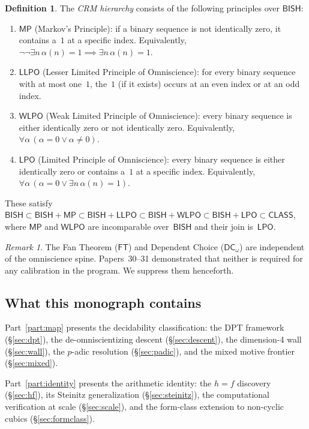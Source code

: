 \documentclass[11pt]{article}
\theoremstyle{plain}
\theoremstyle{definition}
\newtheorem{definition}[theorem]{Definition}
\theoremstyle{remark}
\newtheorem{remark}[theorem]{Remark}
\newcommand{\BISH}{\mathsf{BISH}}
\newcommand{\LPO}{\mathsf{LPO}}
\newcommand{\WLPO}{\mathsf{WLPO}}
\newcommand{\LLPO}{\mathsf{LLPO}}
\newcommand{\MP}{\mathsf{MP}}
\newcommand{\FT}{\mathsf{FT}}
\newcommand{\DC}{\mathsf{DC}}
\newcommand{\CLASS}{\mathsf{CLASS}}
\begin{document}
\begin{definition}\label{def:hierarchy}
The \emph{CRM hierarchy} consists of the following principles over
$\BISH$:
\begin{enumerate}[label=(\roman*)]
\item $\MP$ (Markov's Principle): if a binary sequence is not
  identically zero, it contains a~$1$ at a specific index.
  Equivalently, $\lnot\lnot\exists n\, \alpha(n) = 1 \implies
  \exists n\, \alpha(n) = 1$.
\item $\LLPO$ (Lesser Limited Principle of Omniscience): for
  every binary sequence with at most one~$1$, the~$1$ (if it
  exists) occurs at an even index or at an odd index.
\item $\WLPO$ (Weak Limited Principle of Omniscience): every
  binary sequence is either identically zero or not identically
  zero.  Equivalently, $\forall \alpha\, (\alpha = 0 \lor
  \alpha \ne 0)$.
\item $\LPO$ (Limited Principle of Omniscience): every binary
  sequence is either identically zero or contains a~$1$ at a
  specific index.  Equivalently, $\forall \alpha\,
  (\alpha = 0 \lor \exists n\, \alpha(n) = 1)$.
\end{enumerate}
These satisfy
$\BISH \subset \BISH + \MP \subset \BISH + \LLPO \subset
\BISH + \WLPO \subset \BISH + \LPO \subset \CLASS$,
where $\MP$ and $\WLPO$ are incomparable over~$\BISH$ and their
join is~$\LPO$.
\end{definition}

\begin{remark}
The Fan Theorem ($\FT$) and Dependent Choice ($\DC_\omega$)
are independent of the omniscience spine.  Papers~30--31
demonstrated that neither is required for any calibration in the
program.  We suppress them henceforth.
\end{remark}


\subsection{What this monograph contains}

Part~\ref{part:map} presents the decidability classification:
the DPT framework (\S\ref{sec:dpt}), the de-omniscientizing
descent (\S\ref{sec:descent}), the dimension-4 wall
(\S\ref{sec:wall}), the $p$-adic resolution (\S\ref{sec:padic}),
and the mixed motive frontier (\S\ref{sec:mixed}).

Part~\ref{part:identity} presents the arithmetic identity: the
$h = f$ discovery (\S\ref{sec:hf}), its Steinitz generalization
(\S\ref{sec:steinitz}), the computational verification at scale
(\S\ref{sec:scale}), and the form-class extension to non-cyclic
cubics (\S\ref{sec:formclass}).
\end{document}
